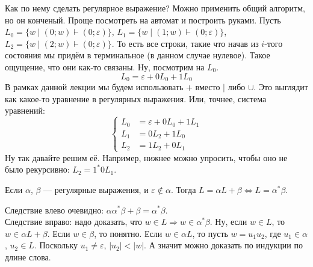\documentclass{article}
\begin{document}
\begin{itemize}
\begin{Comment}
\begin{figure}[H]
            \end{figure}\noindent
            Как по нему сделать регулярное выражение? Можно применить общий алгоритм, но он конченый. Проще посмотреть на автомат и построить руками. Пусть $L_0=\{w\mid (0;w)\vdash(0;\varepsilon)\}$, $L_1=\{w\mid (1;w)\vdash(0;\varepsilon)\}$, $L_2=\{w\mid (2;w)\vdash(0;\varepsilon)\}$. То есть все строки, такие что начав из $i$-того состояния мы придём в терминальное (в данном случае нулевое). Такое ощущение, что они как-то связаны. Ну, посмотрим на $L_0$.
            $$
            L_0=\varepsilon+0L_0+1L_0
            $$
            В рамках данной лекции мы будем использовать $+$ вместо $|$ либо $\cup$. Это выглядит как какое-то уравнение в регулярных выражения. Или, точнее, система уравнений:
            \[
            \left\{\begin{aligned}
                L_0&=\varepsilon+0L_0+1L_1\\
                L_1&=0L_2+1L_0\\
                L_2&=1L_2+0L_1
            \end{aligned}\right.
            \]
            Ну так давайте решим её. Например, нижнее можно упросить, чтобы оно не было рекурсивно: $L_2=1^*0L_1$.
        \end{Comment}
        \thm Если $\alpha$, $\beta$ --- регулярные выражения, и $\varepsilon\notin\alpha$. Тогда $L=\alpha L+\beta\Leftrightarrow L=\alpha^*\beta$.
        \begin{Proof}
            Следствие влево очевидно: $\alpha\alpha^*\beta+\beta=\alpha^*\beta$.\\
            Следствие вправо: надо доказать, что $w\in L\Rightarrow w\in\alpha^*\beta$. Ну, если $w\in L$, то $w\in\alpha L+\beta$. Если $w\in\beta$, то понятно. Если $w\in\alpha L$, то пусть $w=u_1u_2$, где $u_1\in\alpha$, $u_2\in L$. Поскольку $u_1\neq\varepsilon$, $|u_2|<|w|$. А значит можно доказать по индукции по длине слова.

\end{Proof}
\end{itemize}
\end{document}
